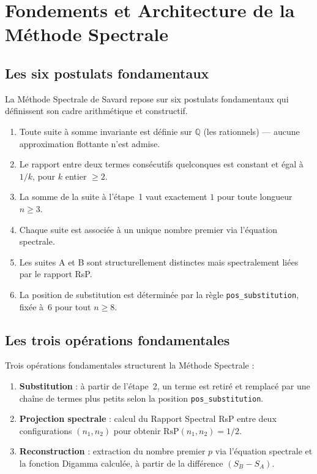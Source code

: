 \documentclass[]{pasj02}
\begin{document}
\section{Fondements et Architecture de la Méthode Spectrale}
\label{sec:fondements}

\subsection{Les six postulats fondamentaux}
\label{ssec:postulats}

La Méthode Spectrale de Savard repose sur six postulats fondamentaux qui
définissent son cadre arithmétique et constructif.

\begin{enumerate}
  \item Toute suite à somme invariante est définie sur $\mathbb{Q}$ (les
        rationnels) --- aucune approximation flottante n'est admise.
  \item Le rapport entre deux termes consécutifs quelconques est constant et
        égal à $1/k$, pour $k$ entier $\geq 2$.
  \item La somme de la suite à l'étape~1 vaut exactement $1$ pour toute
        longueur $n \geq 3$.
  \item Chaque suite est associée à un unique nombre premier via l'équation
        spectrale.
  \item Les suites A et B sont structurellement distinctes mais spectralement
        liées par le rapport RsP.
  \item La position de substitution est déterminée par la règle
        \texttt{pos\_substitution}, fixée à~6 pour tout $n \geq 8$.
\end{enumerate}

\subsection{Les trois opérations fondamentales}
\label{ssec:operations}

Trois opérations fondamentales structurent la Méthode Spectrale :

\begin{enumerate}
  \item \textbf{Substitution} : à partir de l'étape~2, un terme est retiré
        et remplacé par une chaîne de termes plus petits selon la position
        \texttt{pos\_substitution}.
  \item \textbf{Projection spectrale} : calcul du Rapport Spectral RsP entre
        deux configurations $(n_1,n_2)$ pour obtenir
        $\mathrm{RsP}(n_1,n_2)=1/2$.
  \item \textbf{Reconstruction} : extraction du nombre premier $p$ via
        l'équation spectrale et la fonction Digamma calculée, à partir de la
        différence $(S_B - S_A)$.
\end{enumerate}
\end{document}
